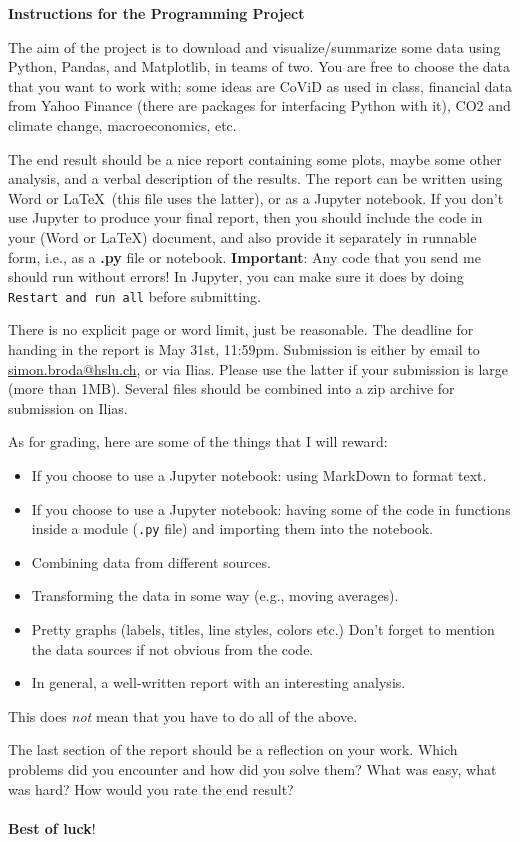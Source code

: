 \documentclass[11pt,a4paper]{article}
\begin{document}
\begin{center}
\bfseries\huge Instructions for the Programming Project
\end{center}
The aim of the project is to download and visualize/summarize some data using Python, Pandas, and Matplotlib, in teams of two. You are free to choose the data that you want to work with; some ideas are CoViD as used in class, financial data from Yahoo Finance (there are packages for interfacing Python with it), CO2 and climate change, macroeconomics, etc.

The end result should be a nice report containing some plots, maybe some other analysis, and a verbal description of the results. The report can be written using Word or \LaTeX\ (this file uses the latter), or as a Jupyter notebook. If you don't use Jupyter to produce your final report, then you should include the code in your (Word or \LaTeX) document, and also provide it separately in runnable form, i.e., as a \textbf{.py} file or notebook. \textbf{Important}: Any code that you send me should run without errors! In Jupyter, you can make sure it does by doing \texttt{Restart and run all} before submitting.

There is no explicit page or word limit, just be reasonable. The deadline for handing in the report is May 31st, 11:59pm. Submission is either by email to \href{mailto:simon.broda@hslu.ch}{simon.broda@hslu.ch}, or via Ilias. Please use the latter if your submission is large (more than 1MB). Several files should be combined into a zip archive for submission on Ilias.

As for grading, here are some of the things that I will reward:
\begin{itemize}
\item If you choose to use a Jupyter notebook: using MarkDown to format text.
\item If you choose to use a Jupyter notebook: having some of the code in functions inside a module (\texttt{.py} file) and importing them into the notebook.
\item Combining data from different sources.
\item Transforming the data in some way (e.g., moving averages).
\item Pretty graphs (labels, titles, line styles, colors etc.) Don't forget to mention the data sources if not obvious from the code.
\item In general, a well-written report with an interesting analysis.
\end{itemize}
This does \emph{not} mean that you have to do all of the above.


The last section of the report should be a reflection on your work. Which problems did you encounter and how did you solve them? What was easy, what was hard? How would you rate the end result?\\\\
\noindent
\textbf{Best of luck}!
\end{document}
